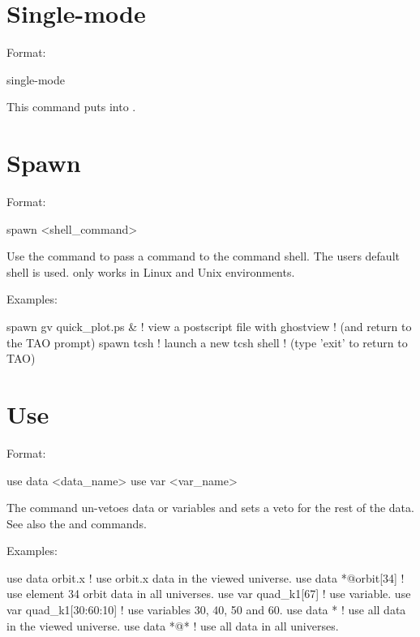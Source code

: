 {{\section{Single-mode}
\label{s:sing}

Format:
\begin{example}
  single-mode
\end{example}

\vskip 0.2in 
This command puts \tao into . 

\section{Spawn}
\label{s:spawn}

Format:
\begin{example}
  spawn <shell_command>
\end{example}

\vskip 0.2in
Use the  command to pass a command to the command shell.  The users
default shell is used.  only works in Linux and Unix environments.

Examples:
\begin{example}
  spawn gv quick_plot.ps &      ! view a postscript file with ghostview
                                ! (and return to the TAO prompt)
  spawn tcsh                    ! launch a new tcsh shell 
                                ! (type 'exit' to return to TAO)
\end{example}

\section{Use}
\label{s:use}

Format:
\begin{example}
  use data  <data_name>
  use var <var_name>
\end{example}

\vskip 0.2in 
The  command un-vetoes data or variables and sets a veto for
the rest of the data. See also the  and 
commands.

Examples:
\begin{example}
  use data orbit.x             ! use orbit.x data in the viewed universe.
  use data *@orbit[34]         ! use element 34 orbit data in all universes.
  use var quad_k1[67]          ! use variable.
  use var quad_k1[30:60:10]    ! use variables 30, 40, 50 and 60.
  use data *                   ! use all data in the viewed universe.
  use data *@*                 ! use all data in all universes.
\end{example}


}}
